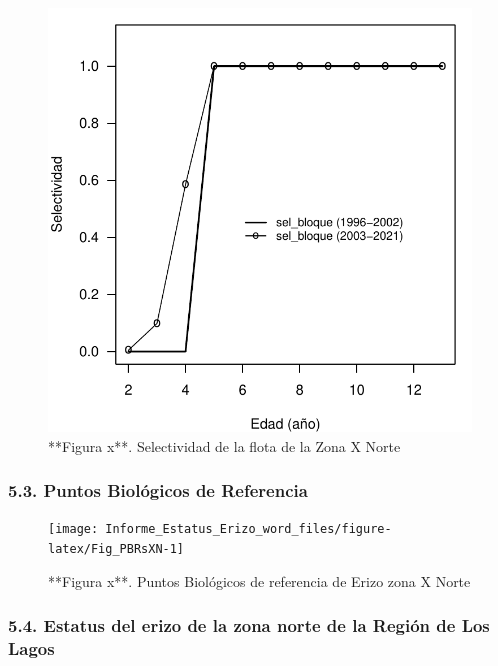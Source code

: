 \documentclass[
]{article}
\begin{document}
\begin{figure}

{\centering \includegraphics{Figuras/Fig_SelFlotaXN-1} 

}

\caption{**Figura x**. Selectividad de la flota de la Zona X Norte}\label{fig:Fig_SelFlotaXN}
\end{figure}

\hypertarget{puntos-bioluxf3gicos-de-referencia}{%
\subsubsection{5.3. Puntos Biológicos de
Referencia}\label{puntos-bioluxf3gicos-de-referencia}}

\begin{figure}

{\centering \texttt{[image: Informe\_Estatus\_Erizo\_word\_files/figure-latex/Fig\_PBRsXN-1]} 

}

\caption{**Figura x**. Puntos Biológicos de referencia de Erizo zona X Norte}\label{fig:Fig_PBRsXN}
\end{figure}

\hypertarget{estatus-del-erizo-de-la-zona-norte-de-la-regiuxf3n-de-los-lagos}{%
\subsubsection{5.4. Estatus del erizo de la zona norte de la Región de
Los
Lagos}\label{estatus-del-erizo-de-la-zona-norte-de-la-regiuxf3n-de-los-lagos}}
\end{document}
